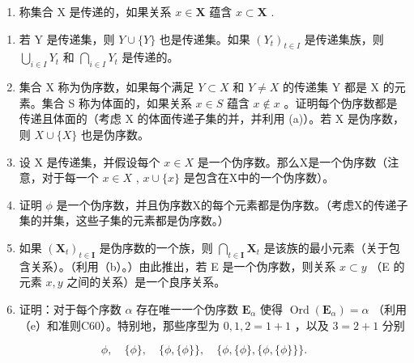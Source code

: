 \begin{enumerate}
\def\labelenumi{\arabic{enumi}.}
\setcounter{enumi}{19}
\tightlist
\item
  称集合 X 是传递的，如果关系 \(x \in \mathbf{X}\) 蕴含 \(x \subset \mathbf{X}\) .
\end{enumerate}

\begin{enumerate}
\def\labelenumi{(\alph{enumi})}
\item
  若 Y 是传递集，则 \(Y \cup \{Y\}\) 也是传递集。如果 \((Y_{t})_{t \in I}\) 是传递集族，则 \(\bigcup_{i \in I} Y_{t}\) 和 \(\bigcap_{i \in I} Y_{t}\) 是传递的。
\item
  集合 X 称为伪序数，如果每个满足 \(Y \subset X\) 和 \(Y \neq X\) 的传递集 Y 都是 X 的元素。集合 S 称为体面的，如果关系 \(x \in S\) 蕴含 \(x \notin x\) 。证明每个伪序数都是传递且体面的（考虑 X 的体面传递子集的并，并利用 (a)）。若 X 是伪序数，则 \(X \cup \{X\}\) 也是伪序数。
\item
  设 X 是传递集，并假设每个 \(x \in X\) 是一个伪序数。那么X是一个伪序数（注意，对于每一个 \(x \in X\) , \(x \cup \{x\}\) 是包含在X中的一个伪序数）。
\item
  证明 \(\phi\) 是一个伪序数，并且伪序数X的每个元素都是伪序数。（考虑X的传递子集的并集，这些子集的元素都是伪序数。）
\item
  如果 \((\mathbf{X}_t)_{t\in \mathbf{I}}\) 是伪序数的一个族，则 \(\bigcap_{t\in \mathbf{I}}\mathbf{X}_t\) 是该族的最小元素（关于包含关系）。（利用（b）。）由此推出，若 E 是一个伪序数，则关系 \(x\subset y\) （E 的元素 \(x,y\) 之间的关系）是一个良序关系。
\item
  证明：对于每个序数 \(\alpha\) 存在唯一一个伪序数 \(\mathbf{E}_{\alpha}\) 使得 \(\operatorname{Ord}(\mathbf{E}_{\alpha}) = \alpha\) （利用（e）和准则C60）。特别地，那些序型为 \(0, 1, 2 = 1 + 1\) ，以及 \(3 = 2 + 1\) 分别
\end{enumerate}

\[
\phi , \quad \{\phi \}, \quad \{\phi , \{\phi \} \}, \quad \{\phi , \{\phi \}, \{\phi , \{\phi \} \} \}.
\]

